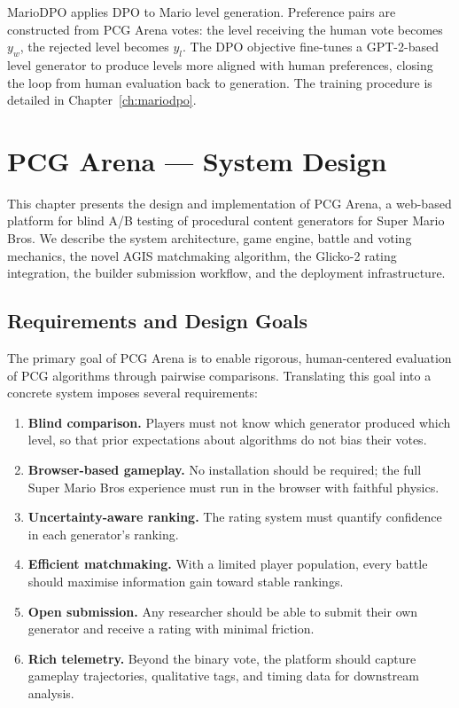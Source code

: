 \documentclass[shortabstract, mgr, english]{iithesis}
\begin{document}
MarioDPO applies DPO to Mario level
generation. Preference pairs are constructed from PCG Arena votes: the level
receiving the human vote becomes $y_w$, the rejected level becomes $y_l$. The DPO
objective fine-tunes a GPT-2-based level generator to produce levels more aligned
with human preferences, closing the loop from human evaluation back to
generation. The training procedure is detailed in Chapter~\ref{ch:mariodpo}.


\chapter{PCG Arena --- System Design}
\label{ch:system-design}

This chapter presents the design and implementation of PCG Arena, a web-based platform for
blind A/B testing of procedural content generators for Super Mario Bros. We describe the
system architecture, game engine, battle and voting mechanics, the novel AGIS matchmaking
algorithm, the Glicko-2 rating integration, the builder submission workflow, and the
deployment infrastructure.

\section{Requirements and Design Goals}
\label{sec:sd-requirements}

The primary goal of PCG Arena is to enable rigorous, human-centered evaluation of PCG
algorithms through pairwise comparisons. Translating this goal into a concrete system
imposes several requirements:

\begin{enumerate}
    \item \textbf{Blind comparison.} Players must not know which generator produced which
          level, so that prior expectations about algorithms do not bias their votes.
    \item \textbf{Browser-based gameplay.} No installation should be required; the full
          Super Mario Bros experience must run in the browser with faithful physics.
    \item \textbf{Uncertainty-aware ranking.} The rating system must quantify confidence
          in each generator's ranking.
    \item \textbf{Efficient matchmaking.} With a limited player population, every battle
          should maximise information gain toward stable rankings.
    \item \textbf{Open submission.} Any researcher should be able to submit their own
          generator and receive a rating with minimal friction.
    \item \textbf{Rich telemetry.} Beyond the binary vote, the platform should capture
          gameplay trajectories, qualitative tags, and timing data for downstream analysis.
\end{enumerate}
\end{document}
